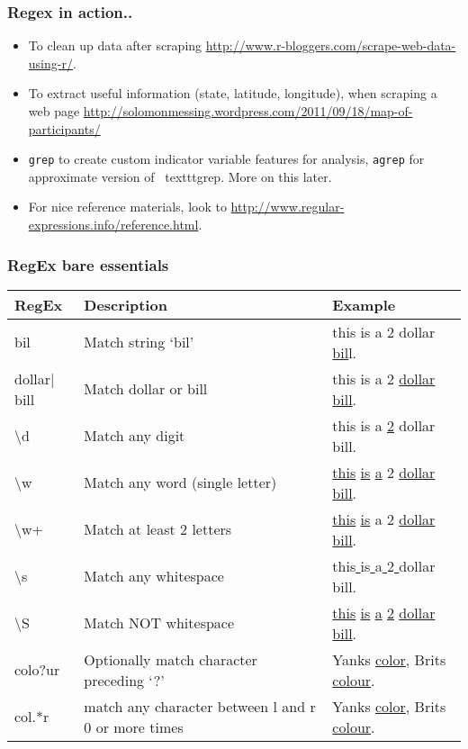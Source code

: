 \documentclass[]{beamer}
\begin{document}
\begin{frame}
\frametitle{Regex in action..}   %
\begin{itemize}
  \item To clean up data after scraping \url{http://www.r-bloggers.com/scrape-web-data-using-r/}.
  \item To extract useful information (state, latitude, longitude), when scraping a web page \url{http://solomonmessing.wordpress.com/2011/09/18/map-of-participants/}
  \item \texttt{grep} to create custom indicator variable features for analysis, \texttt{agrep} for approximate version of 		\
texttt{grep}. More on this later.
\item For nice reference materials, look to \url{http://www.regular-expressions.info/reference.html}.
\end{itemize}
\end{frame}

\begin{frame}
\frametitle{RegEx bare essentials}   %
\begin{tabular}{lp{1.5in}p{2in}}
RegEx & Description & Example \\ \hline
bil & Match string `bil' & this is a 2 dollar \underline{bil}l. \\
dollar$|$bill & Match dollar or bill & this is a 2 \underline{dollar} \underline{bill}. \\
\textbackslash d & Match any digit & this is a \underline{2} dollar bill. \\
\textbackslash w & Match any word (single letter) & \underline{this} \underline{is} \underline{a} 2 \underline{dollar} \underline{bill}. \\
\textbackslash w+ & Match at least 2 letters & \underline{this} \underline{is} a 2 \underline{dollar} \underline{bill}. \\
\textbackslash s & Match any whitespace & this\underline{ }is\underline{ }a\underline{ }2\underline{ }dollar\underline{ }bill. \\
\textbackslash S & Match NOT whitespace & \underline{this} \underline{is} \underline{a} \underline{2} \underline{dollar} \underline{bill}.\\
colo?ur & Optionally match character preceding `?' & Yanks \underline{color}, Brits \underline{colour}. \\
col.*r & match any character between l and r 0 or more times & Yanks \underline{color}, Brits \underline{colour}. \\
\end{tabular}
\end{frame}
\end{document}
